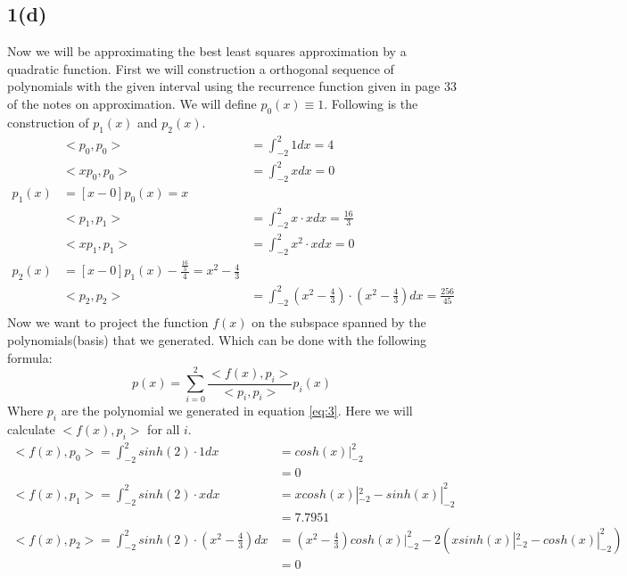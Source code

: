 \documentclass{article}
\begin{document}
\subsection*{1(d)}
Now we will be approximating the best least squares approximation by a quadratic function. First we will construction a orthogonal sequence of polynomials with the given interval using the recurrence function given in page 33 of the notes on approximation. We will define $p_0(x) \equiv 1$. Following is the construction of $p_1(x)$ and $p_2(x)$.
\begin{equation}\label{eq:3}
\begin{aligned}
&<p_0,p_0> &= \int_{-2}^2 1 dx = 4\\
&<xp_0,p_0> &= \int_{-2}^2 x dx = 0\\
p_1(x) &= [x - 0]p_0(x) = x\\
&<p_1,p_1> &= \int_{-2}^{2} x\cdot x dx = \frac{16}{3}\\
&<xp_1,p_1> &= \int_{-2}^{2} x^2\cdot x dx = 0\\
p_2(x) &= [x - 0]p_1(x) - \frac{\frac{16}{3}}{4} = x^2 - \frac{4}{3}\\
&<p_2,p_2> &= \int_{-2}^{2} (x^2 - \frac{4}{3}) \cdot (x^2 - \frac{4}{3}) dx = \frac{256}{45}\\
\end{aligned}
\end{equation}
Now we want to project the function $f(x)$ on the subspace spanned by the polynomials(basis) that we generated. Which can be done with the following formula:
\begin{equation*}
p(x) = \sum_{i=0}^{2} \frac{<f(x),p_i>}{<p_i,p_i>}p_i(x)
\end{equation*}
Where $p_i$ are the polynomial we generated in equation \ref{eq:3}. Here we will calculate $<f(x),p_i>$ for all $i$.
\begin{equation*}
\begin{aligned}
<f(x),p_0> = \int_{-2}^2 sinh(2) \cdot 1 dx &= cosh(x)|_{-2}^2 \\
& = 0\\
<f(x),p_1> = \int_{-2}^2 sinh(2) \cdot x dx &= x cosh(x)|_{-2}^2 - sinh(x)|_{-2}^2 \\
& = 7.7951\\
<f(x),p_2> = \int_{-2}^2 sinh(2) \cdot (x^2 - \frac{4}{3}) dx &= (x^2 - \frac{4}{3}) cosh(x)|_{-2}^2 -2(x sinh(x)|_{-2}^2 - cosh(x)|_{-2}^2)\\
& = 0\\
\end{aligned}
\end{equation*}
\end{document}
